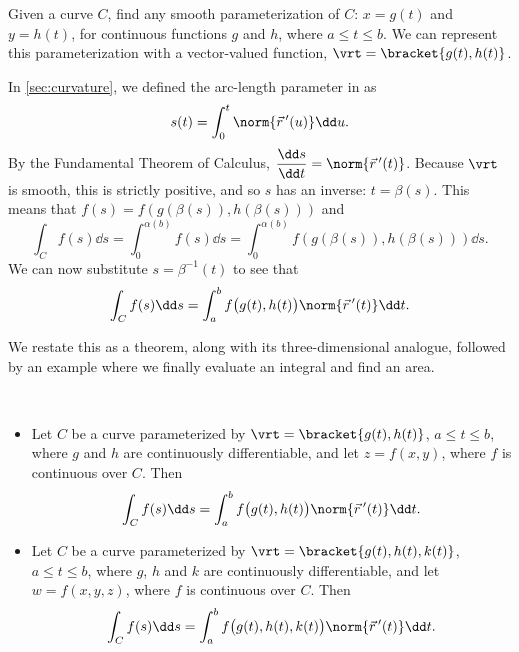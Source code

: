 
Given a curve $C$, find any smooth parameterization of $C$: $x = g(t)$ and $y=h(t)$, for continuous functions $g$ and $h$, where $a\leq t\leq b$. We can represent this parameterization with a vector-valued function, $\vrt =\bracket{g(t),h(t)}$.

In \autoref{sec:curvature}, we defined the arc-length parameter in  as 
\[s(t) = \int_0^t \norm{\vec r\,'(u)}\dd u.\]
By the Fundamental Theorem of Calculus, $\dfrac{\dd s}{\dd t} = \norm{\vec r\,'(t)}$. Because $\vrt$ is smooth, this is strictly positive, and so $s$ has an inverse: $t=\beta(s)$.  This means that $f(s)=f(g(\beta(s)),h(\beta(s)))$ and
%
\[\int_C f(s)\dd s = \int_0^{\alpha(b)} f(s)\dd s = \int_0^{\alpha(b)}f(g(\beta(s)),h(\beta(s)))\dd s. \]
We can now substitute $s=\beta^{-1}(t)$ to see that
\[\int_C f(s)\dd s = \int_a^bf\bigl(g(t),h(t)\bigr)\norm{\vec r\,'(t)}\dd t.\]

We restate this as a theorem, along with its three-dimensional analogue, followed by an example where we finally evaluate an integral and find an area.

\begin{theorem}\label{thm:line1}
%
\mbox{}\\[-2\baselineskip]\parbox[t]{\linewidth}{\begin{itemize}
	\item Let $C$ be a curve parameterized by $\vrt =\bracket{g(t),h(t)}$, $a\leq t\leq b$, where $g$ and $h$ are continuously differentiable, and let $z=f(x,y)$, where $f$ is continuous over $C$. Then
\[\int_Cf(s)\dd s = \int_a^bf\bigl(g(t),h(t)\bigr)\norm{\vec r\,'(t)}\dd t.\]
	\item Let $C$ be a curve parameterized by $\vrt =\bracket{g(t),h(t),k(t)}$, $a\leq t\leq b$, where $g$, $h$ and $k$ are continuously differentiable, and let $w=f(x,y,z)$, where $f$ is continuous over $C$. Then
\[\int_Cf(s)\dd s = \int_a^bf\bigl(g(t),h(t),k(t)\bigr)\norm{\vec r\,'(t)}\dd t.\]
\end{itemize}}
\end{theorem}

